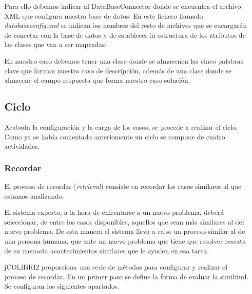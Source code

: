 Para ello debemos indicar al DataBaseConnector donde se encuentra el archivo XML que configura nuestra base de datos. En este fichero llamado \emph{databaseconfig.xml} se indican los nombres del resto de archivos que se encargarán de conectar con la base de datos y de establecer la estructura de los atributos de las clases que van a ser mapeadas.

En nuestro caso debemos tener una clase donde se almacenen las cinco palabras clave que forman nuestro caso de descripción, además de una clase donde se almacene el campo respuesta que forma nuestro caso solución.

\subsection{Ciclo}\label{ciclo}

Acabada la configuración y la carga de los casos, se procede a realizar el ciclo. Como ya se había comentado anteriomente un ciclo se compone de cuatro actividades.


\subsubsection{Recordar}\label{recordar}

El proceso de recordar (\emph{retrieval}) consiste en recordar los casos similares al que estamos analizando.

El sistema experto, a la hora de enfrentarse a un nuevo problema, deberá seleccionar, de entre los casos disponibles, aquellos que sean más similares al del nuevo problema. De esta manera el sistema lleva a cabo un proceso similar al de una persona humana, que ante un nuevo problema que tiene que resolver rescata de su memoria acontecimientos similares que le ayuden en esa tarea.

jCOLIBRI2 proporciona una serie de métodos para configurar y realizar el proceso de recordar. 
En un primer paso se define la forma de evaluar la similitud. Se configuran los siguientes apartados.

